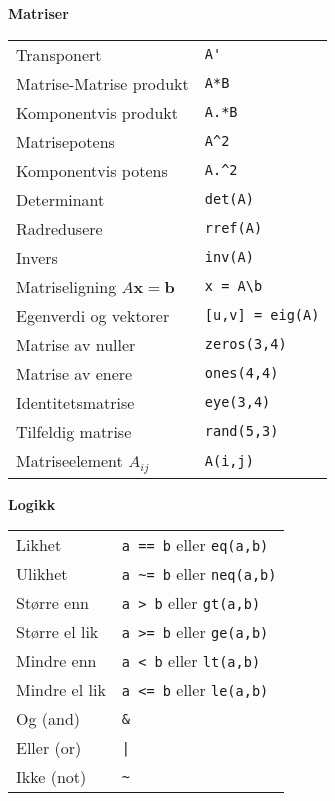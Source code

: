 \documentclass[a4paper, 12pt, notitlepage, english]{article}
\newcommand{\bt}[1]{\boldsymbol{#1}}
\begin{document}
\begin{multicols}{2}
\newpage

{\large \bf Matriser}
$ $ \\ 
\begin{tabular}{l l}
Transponert & \verb+A'+ \\
Matrise-Matrise produkt & \verb+A*B+ \\
Komponentvis produkt & \verb+A.*B+ \\
Matrisepotens & \verb+A^2+ \\
Komponentvis potens & \verb+A.^2+ \\
Determinant & \verb+det(A)+ \\
Radredusere & \verb+rref(A)+ \\
Invers & \verb+inv(A)+ \\
Matriseligning $A\bt{x}=\bt{b}$ & \verb+x = A\b+
\\
Egenverdi og vektorer & \verb+[u,v] = eig(A)+ \\
Matrise av nuller & \verb+zeros(3,4)+ \\
Matrise av enere & \verb+ones(4,4)+ \\
Identitetsmatrise & \verb+eye(3,4)+ \\
Tilfeldig matrise & \verb+rand(5,3)+ \\
Matriseelement $A_{ij}$ & \verb+A(i,j)+
\end{tabular}

\vspace{2cm}

{\large \bf Logikk}
$ $ \\ 
\begin{tabular}{l l}
Likhet & \verb+a == b+ eller \verb+eq(a,b)+ \\
Ulikhet & \verb+a ~= b+ eller \verb+neq(a,b)+ \\
Større enn & \verb+a > b+ eller \verb+gt(a,b)+ \\
Større el lik & \verb+a >= b+ eller \verb+ge(a,b)+ \\
Mindre enn & \verb+a < b+ eller \verb+lt(a,b)+ \\
Mindre el lik & \verb+a <= b+ eller \verb+le(a,b)+ \\
Og (and) & \verb+&+ \\
Eller (or) & \verb+|+ \\
Ikke (not) & \verb+~+ \\
\end{tabular}



\end{multicols}
\end{document}
